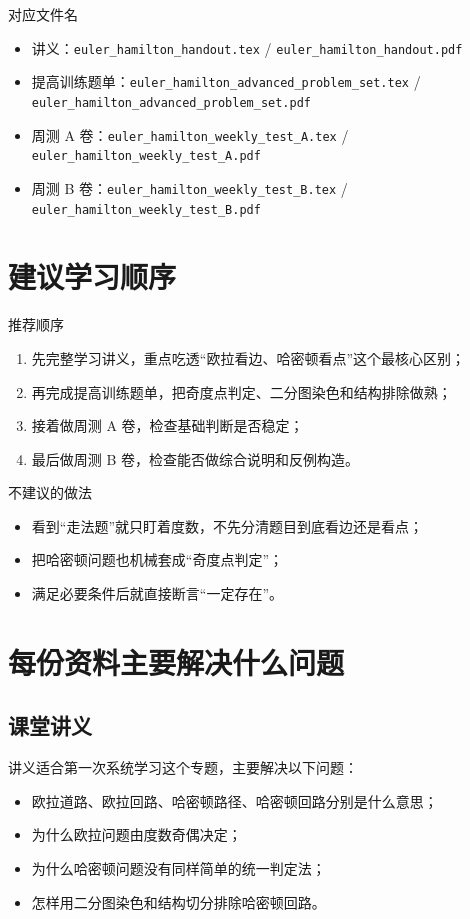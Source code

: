 \documentclass[11pt,a4paper,fontset=fandol]{ctexart}
\begin{document}
\begin{infobox}{对应文件名}
\begin{itemize}
  \item 讲义：\texttt{euler\_hamilton\_handout.tex} / \texttt{euler\_hamilton\_handout.pdf}
  \item 提高训练题单：\texttt{euler\_hamilton\_advanced\_problem\_set.tex} / \texttt{euler\_hamilton\_advanced\_problem\_set.pdf}
  \item 周测 A 卷：\texttt{euler\_hamilton\_weekly\_test\_A.tex} / \texttt{euler\_hamilton\_weekly\_test\_A.pdf}
  \item 周测 B 卷：\texttt{euler\_hamilton\_weekly\_test\_B.tex} / \texttt{euler\_hamilton\_weekly\_test\_B.pdf}
\end{itemize}
\end{infobox}

\section{建议学习顺序}

\begin{goalbox}{推荐顺序}
\begin{enumerate}
  \item 先完整学习讲义，重点吃透“欧拉看边、哈密顿看点”这个最核心区别；
  \item 再完成提高训练题单，把奇度点判定、二分图染色和结构排除做熟；
  \item 接着做周测 A 卷，检查基础判断是否稳定；
  \item 最后做周测 B 卷，检查能否做综合说明和反例构造。
\end{enumerate}
\end{goalbox}

\begin{warnbox}{不建议的做法}
\begin{itemize}
  \item 看到“走法题”就只盯着度数，不先分清题目到底看边还是看点；
  \item 把哈密顿问题也机械套成“奇度点判定”；
  \item 满足必要条件后就直接断言“一定存在”。
\end{itemize}
\end{warnbox}

\section{每份资料主要解决什么问题}

\subsection{课堂讲义}
讲义适合第一次系统学习这个专题，主要解决以下问题：
\begin{itemize}
  \item 欧拉道路、欧拉回路、哈密顿路径、哈密顿回路分别是什么意思；
  \item 为什么欧拉问题由度数奇偶决定；
  \item 为什么哈密顿问题没有同样简单的统一判定法；
  \item 怎样用二分图染色和结构切分排除哈密顿回路。
\end{itemize}
\end{document}
